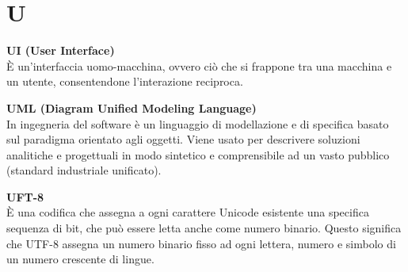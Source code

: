 \section{U}
\textbf{UI (User Interface)}\\
È un'interfaccia uomo-macchina, ovvero ciò che si frappone tra una macchina e un utente, consentendone l'interazione reciproca.

\textbf{UML (Diagram Unified Modeling Language)}\\
In ingegneria del software è un linguaggio di modellazione e di specifica basato sul paradigma orientato agli oggetti. Viene usato per descrivere soluzioni analitiche e progettuali in modo sintetico e comprensibile ad un vasto pubblico (standard industriale unificato).

\textbf{UFT-8}\\
È una codifica che assegna a ogni carattere Unicode esistente una specifica sequenza di bit, che può essere letta anche come numero binario. Questo significa che UTF-8 assegna un numero binario fisso ad ogni lettera, numero e simbolo di un numero crescente di lingue.

\clearpage